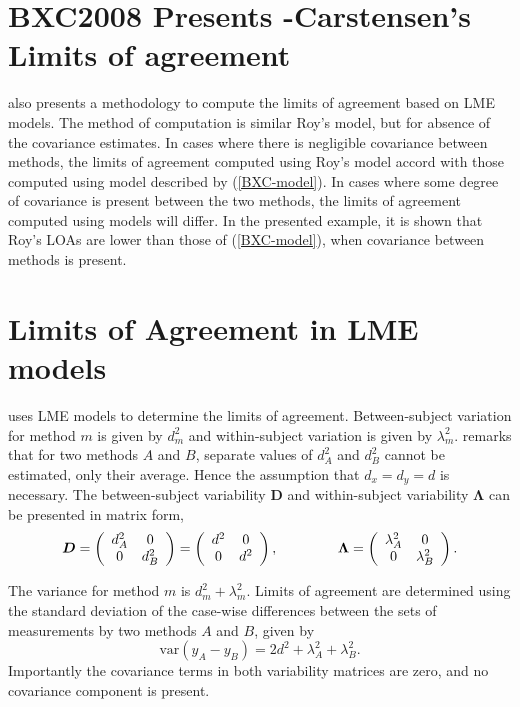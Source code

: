 \documentclass[12pt, a4paper]{report}
\theoremstyle{plain}
\theoremstyle{definition}
\theoremstyle{remark}
\begin{document}
\section{BXC2008 Presents -Carstensen's Limits of agreement}
\citet{BXC2008} also presents a methodology to compute the limits of agreement based on LME models. The method of computation is similar Roy's model, but for absence of the covariance estimates. In cases where there is negligible covariance between methods, the limits of agreement computed using Roy's model accord with those computed using model described by (\ref{BXC-model}). In cases where some degree of covariance is present between the two methods, the limits of agreement computed using models will differ. In the presented example, it is shown that Roy's LOAs are lower than those of (\ref{BXC-model}), when covariance between methods is present.


	\section{Limits of Agreement in LME models}
	\citet{BXC2008} uses LME models to determine the limits of agreement. Between-subject variation for method $m$ is given by $d^2_{m}$ and within-subject variation is given by $\lambda^2_{m}$.  \citet{BXC2008} remarks that for two methods $A$ and $B$, separate values of $d^2_{A}$ and $d^2_{B}$ cannot be estimated, only their average. Hence the assumption that $d_{x}= d_{y}= d$ is necessary. The between-subject variability $\boldsymbol{D}$ and within-subject variability $\boldsymbol{\Lambda}$ can be presented in matrix form,\[
	\boldsymbol{D} = \left(%
	\begin{array}{cc}
	d^2_{A}& 0 \\
	0 & d^2_{B} \\
	\end{array}%
	\right)=\left(%
	\begin{array}{cc}
	d^2& 0 \\
	0 & d^2\\
	\end{array}%
	\right),
	\hspace{1.5cm}
	\boldsymbol{\Lambda} = \left(%
	\begin{array}{cc}
	\lambda^2_{A}& 0 \\
	0 & \lambda^2_{B} \\
	\end{array}%
	\right).
	\]
	
	The variance for method $m$ is $d^2_{m}+\lambda^2_{m}$. Limits of agreement are determined using the standard deviation of the case-wise differences between the sets of measurements by two methods $A$ and $B$, given by
	\begin{equation}
	\mbox{var} (y_{A}-y_{B}) = 2d^2 + \lambda^2_{A}+ \lambda^2_{B}.
	\end{equation}
	Importantly the covariance terms in both variability matrices are zero, and no covariance component is present.
	
\end{document}
